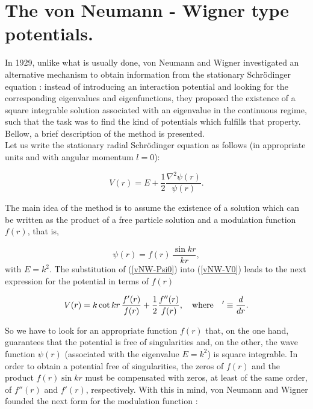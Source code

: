 \documentclass[a4paper]{jpconf}
\begin{document}
\section{The von Neumann - Wigner type potentials.}


In 1929, unlike what is usually done, von Neumann and Wigner investigated an alternative mechanism to obtain information from the stationary Schr\" odinger equation \cite{vNW,Stillinger}: instead of introducing an interaction potential and  looking for the corresponding eigenvalues and eigenfunctions, they proposed the existence of a square integrable solution associated with an eigenvalue in the continuous regime,  such that the task was to find the kind of potentials which fulfills that property. Bellow, a brief description of the method is presented.\\
Let us write the stationary radial Schr\" odinger equation as follows (in appropriate units and with angular momentum $l=0$):

\begin{equation}
V(r)=E+\frac{1}{2}\frac{\nabla^2\psi(r)}{\psi(r)}.\label{vNW-V0}
\end{equation}

The main idea of the method is to assume the existence of a solution which can be written as the product of a free particle solution and a modulation function $f(r)$, that is, 

\begin{equation}
\psi(r)=f(r)\,\frac{\sin{kr}}{kr},\label{vNW-Psi0}
\end{equation}
with $E=k^2$. The substitution of (\ref{vNW-Psi0}) into (\ref{vNW-V0}) leads to the next expression for the potential in terms of $f(r)$ 

\begin{equation}
V(r)= k \cot{kr}\,\frac{f'(r)}{f(r)}+\frac{1}{2}\frac{f''(r)}{f(r)}, \quad {\rm where}\quad '\equiv \frac{d}{dr}.\label{vNW-V1}
\end{equation}

So we have to look for an appropriate function $f(r)$ that, on the one hand, guarantees that the potential is free of singularities and, on the other, the wave function $\psi(r)$ (associated with the eigenvalue $E=k^2$) is square integrable.
In order to obtain a potential free of singularities, the zeros of $f(r)$ and the product $f(r) \sin{kr}$ must be compensated with zeros, at least of the same order, of $f''(r)$ and $f'(r)$, respectively. With this in mind, von Neumann and Wigner founded the next form for the modulation function \cite{vNW}:
\end{document}
